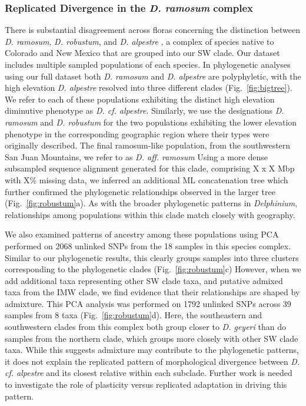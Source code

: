 \documentclass[11pt]{article}
\begin{document}
\subsubsection{Replicated Divergence in the \emph{D. ramosum} complex}
% 
There is substantial disagreement across floras concerning the distinction between 
\emph{D. ramosum}, \emph{D. robustum}, and \emph{D. alpestre} 
\citep{ewan_synopsis_1945,ackerfield_flora_2022,weber_},
a complex of species native to Colorado and New Mexico that are grouped into
our SW clade.
% 
Our dataset includes multiple sampled populations of each species. 
% 
In phylogenetic analyses using our full dataset both \emph{D. ramosum} and 
\emph{D. alpestre} are polyphyletic, with the high elevation \emph{D. alpestre}
resolved into three different clades (Fig.~\ref{fig:bigtree}).
We refer to each of these populations exhibiting the distinct high elevation 
diminutive phenotype as \emph{D. cf. alpestre}.
Similarly, we use the designations \emph{D. ramosum} and \emph{D. robustum} for
the two populations exhibiting the lower elevation phenotype in the corresponding 
geographic region where their types were originally described. 
The final ramosum-like population, from the southwestern San Juan Mountains, 
we refer to as \emph{D. aff. ramosum}
% 
Using a more dense subsampled sequence alignment generated for this clade,
comprising X x X Mbp with X\% missing data, we inferred an additional ML 
concatenation tree which further confirmed the phylogenetic relationships
observed in the larger tree (Fig.~\ref{fig:robustum}a).
% 
As with the broader phylogenetic patterns in \emph{Delphinium}, relationships
among populations within this clade match closely with geography.
%  

% 
We also examined patterns of ancestry among these populations using PCA performed
on 2068 unlinked SNPs from the 18 samples in this species complex.
Similar to our phylogenetic results, this clearly groups samples into three
clusters corresponding to the phylogenetic clades (Fig.~\ref{fig:robustum}c)
% 
However, when we add additional taxa representing other SW clade taxa, and
putative admixed taxa from the IMW clade, 
we find evidence that their relationships are shaped by admixture.
% 
This PCA analysis was performed on 1792 unlinked SNPs across 39 samples 
from 8 taxa (Fig.~\ref{fig:robustum}d). 
Here, the southeastern and southwestern clades from this complex both 
group closer to \emph{D. geyeri} than do samples from the northern 
clade, which groups more closely with other SW clade taxa. 
% 
While this suggests admixture may contribute to the phylogenetic patterns,
it does not explain the replicated pattern of morphological divergence 
between \emph{D. cf. alpestre} and its closest relative within each subclade.
Further work is needed to investigate the role of plasticity versus 
replicated adaptation in driving this pattern.
\end{document}
